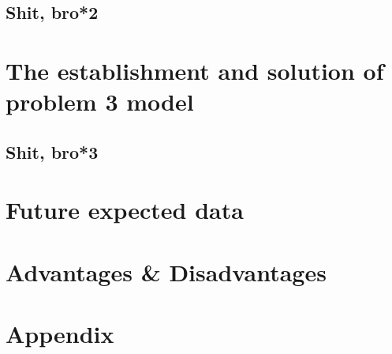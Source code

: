 \documentclass[12pt]{article}
\begin{document}
	\subsection{Shit, bro*2}\label{subsec:shit-bro*2} %
	
\section{The establishment and solution of problem 3 model}\label{sec:the-establishment-and-solution-of-problem-3-model} %
	\subsection{Shit, bro*3}\label{subsec:shit-bro*3} %
	
\section{Future expected data}\label{sec:future-expected-data} %

\section{Advantages \& Disadvantages}\label{sec:advantages-&-disadvantages} %



\section*{Appendix}\label{sec:appendix} %
\end{document}
